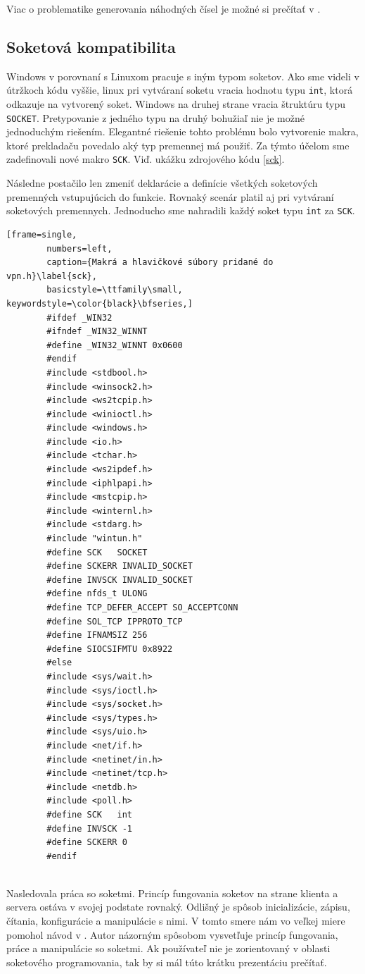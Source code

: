 Viac o problematike generovania náhodných čísel je možné si prečítať v \cite{bc}.
\subsection{Soketová kompatibilita}
Windows v porovnaní s Linuxom pracuje s iným typom soketov. Ako sme videli v útržkoch kódu vyššie, linux pri vytváraní soketu vracia hodnotu typu \lstinline|int|, ktorá odkazuje na vytvorený soket. Windows na druhej strane vracia štruktúru typu \lstinline|SOCKET|. Pretypovanie z jedného typu na druhý bohužiaľ nie je možné jednoduchým riešením. Elegantné riešenie tohto problému bolo vytvorenie makra, ktoré prekladaču povedalo aký typ premennej má použiť. Za týmto účelom sme zadefinovali nové makro \lstinline|SCK|. Viď. ukážku zdrojového kódu \ref{sck}.

Následne postačilo len zmeniť deklarácie a definície všetkých soketových premenných vstupujúcich do funkcie. Rovnaký scenár platil aj pri vytváraní soketových premennych. Jednoducho sme nahradili každý soket typu \lstinline|int| za \lstinline|SCK|.   

\begin{minipage}{\linewidth} 	
	\begin{lstlisting}[frame=single,
		numbers=left,
		caption={Makrá a hlavičkové súbory pridané do vpn.h}\label{sck},
		basicstyle=\ttfamily\small, keywordstyle=\color{black}\bfseries,]
		#ifdef _WIN32
		#ifndef _WIN32_WINNT
		#define _WIN32_WINNT 0x0600
		#endif
		#include <stdbool.h>
		#include <winsock2.h>
		#include <ws2tcpip.h>
		#include <winioctl.h>
		#include <windows.h>
		#include <io.h>
		#include <tchar.h>
		#include <ws2ipdef.h>
		#include <iphlpapi.h>
		#include <mstcpip.h>
		#include <winternl.h>
		#include <stdarg.h>
		#include "wintun.h"
		#define SCK   SOCKET
		#define SCKERR INVALID_SOCKET
		#define INVSCK INVALID_SOCKET
		#define nfds_t ULONG
		#define TCP_DEFER_ACCEPT SO_ACCEPTCONN
		#define SOL_TCP IPPROTO_TCP
		#define IFNAMSIZ 256
		#define SIOCSIFMTU 0x8922 
		#else
		#include <sys/wait.h>
		#include <sys/ioctl.h>
		#include <sys/socket.h>
		#include <sys/types.h>
		#include <sys/uio.h>
		#include <net/if.h>
		#include <netinet/in.h>
		#include <netinet/tcp.h>
		#include <netdb.h>
		#include <poll.h>
		#define SCK   int
		#define INVSCK -1
		#define SCKERR 0
		#endif
	\end{lstlisting}
\end{minipage}\\ 

Nasledovala práca so soketmi. Princíp fungovania soketov na strane klienta a servera ostáva v svojej podstate rovnaký. Odlišný je spôsob inicializácie, zápisu, čítania, konfigurácie a manipulácie s nimi. V tomto smere nám vo veľkej miere pomohol návod v \cite{sck}. Autor názorným spôsobom vysvetľuje princíp fungovania, práce a manipulácie so soketmi. Ak používateľ nie je zorientovaný v oblasti soketového programovania, tak by si mál túto krátku prezentáciu prečítať.

